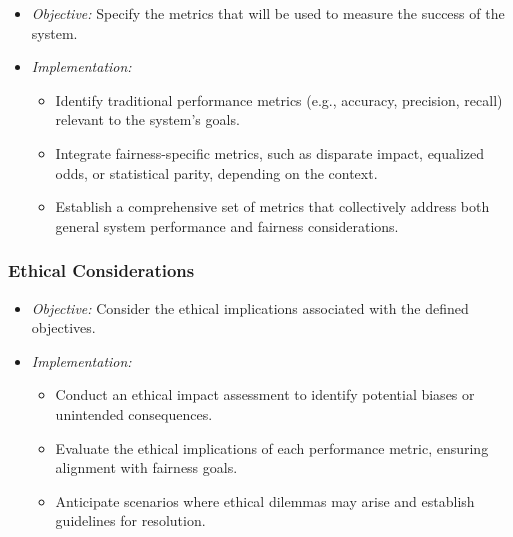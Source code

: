 \documentclass[12pt,a4paper,openright,twoside]{book}
\begin{document}
\begin{itemize}

    \item \emph{Objective:} Specify the metrics that will be used to measure the success of the system.
    
    \item \emph{Implementation:}
        
    \begin{itemize}
            
        \item Identify traditional performance metrics (e.g., accuracy, precision, recall) relevant to the system's goals.
            
        \item Integrate fairness-specific metrics, such as disparate impact, equalized odds, or statistical parity, depending on the context.
            
        \item Establish a comprehensive set of metrics that collectively address both general system performance and fairness considerations.

    \end{itemize}

\end{itemize}

\subsubsection{Ethical Considerations}

\begin{itemize}

    \item \emph{Objective:} Consider the ethical implications associated with the defined objectives.

    \item \emph{Implementation:}

        \begin{itemize}

            \item Conduct an ethical impact assessment to identify potential biases or unintended consequences.

            \item Evaluate the ethical implications of each performance metric, ensuring alignment with fairness goals.

            \item Anticipate scenarios where ethical dilemmas may arise and establish guidelines for resolution.

        \end{itemize}

\end{itemize}
\end{document}
